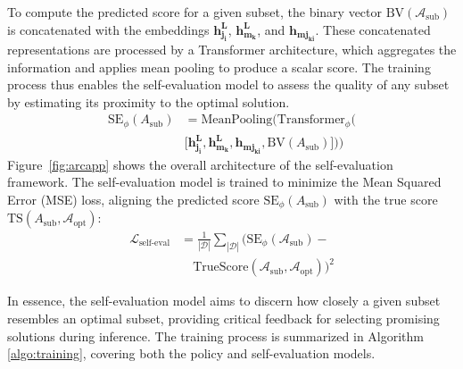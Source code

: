 To compute the predicted score for a given subset, the binary vector \( \text{BV}( \mathcal{A}_\text{sub}) \) is concatenated with the embeddings \( \boldsymbol{h_{j_{i}}^L} \), \( \boldsymbol{h_{m_{k}}^L} \), and \( \boldsymbol{h_{mj_{ki}}} \). These concatenated representations are processed by a Transformer architecture, which aggregates the information and applies mean pooling to produce a scalar score. The training process thus enables the self-evaluation model to assess the quality of any subset by estimating its proximity to the optimal solution.
\begin{align}
\text{SE}_\phi(A_\text{sub}) &= \text{MeanPooling} \Bigg( \text{Transformer}_{\phi}\bigg(     \nonumber \\
    &
        \big[\boldsymbol{h_{j_{i}}^L}, \boldsymbol{h_{m_{k}}^L}, \boldsymbol{h_{mj_{ki}}}, \text{BV}(A_\text{sub})\big]
    \bigg) 
\Bigg)
\end{align}
Figure~\ref{fig:arcapp} shows the overall architecture of the self-evaluation framework. The self-evaluation model is trained to minimize the Mean Squared Error (MSE) loss, aligning the predicted score $\text{SE}_\phi(A_\text{sub})$ with the true score $\text{TS}(A_\text{sub}, \mathcal{A}_{\text{opt}})$:
\begin{align}
\mathcal{L}_{\text{self-eval}} &= \frac{1}{|\mathcal{D}|} \sum_{|\mathcal{D}|} \big(\text{SE}_\phi(\mathcal{A}_\text{sub}) -  \nonumber \\
&\quad \text{TrueScore}(\mathcal{A}_\text{sub}, \mathcal{A}_{\text{opt}})\big)^2
\end{align}

In essence, the self-evaluation model aims to discern how closely a given subset resembles an optimal subset, providing critical feedback for selecting promising solutions during inference. The training process is summarized in Algorithm \ref{algo:training}, covering both the policy and self-evaluation models.

